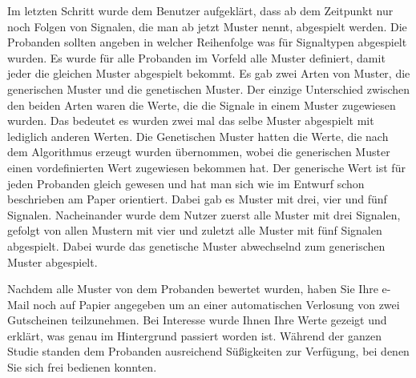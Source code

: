 Im letzten Schritt wurde dem Benutzer aufgekl{\"a}rt, dass ab dem Zeitpunkt nur noch Folgen von Signalen, die man ab jetzt Muster nennt, abgespielt werden.
Die Probanden sollten angeben in welcher Reihenfolge was f{\"u}r Signaltypen abgespielt wurden. 
Es wurde f{\"u}r alle Probanden im Vorfeld alle Muster definiert, damit jeder die gleichen Muster abgespielt bekommt. 
Es gab zwei Arten von Muster, die generischen Muster und die genetischen Muster. 
Der einzige Unterschied zwischen den beiden Arten waren die Werte, die die Signale in einem Muster zugewiesen wurden. 
Das bedeutet es wurden zwei mal das selbe Muster abgespielt mit lediglich anderen Werten. 
Die Genetischen Muster hatten die Werte, die nach dem Algorithmus erzeugt wurden {\"u}bernommen, wobei die generischen Muster einen vordefinierten Wert zugewiesen bekommen hat. 
Der generische Wert ist f{\"u}r jeden Probanden gleich gewesen und hat man sich wie im Entwurf schon beschrieben am Paper \cite{pescara2016ruttelflug} orientiert.
Dabei gab es Muster mit drei, vier und f{\"u}nf Signalen. 
Nacheinander wurde dem Nutzer zuerst alle Muster mit drei Signalen, gefolgt von allen Mustern mit vier und zuletzt alle Muster mit fünf Signalen abgespielt. 
Dabei wurde das genetische Muster abwechselnd zum generischen Muster abgespielt. 

Nachdem alle Muster von dem Probanden bewertet wurden, haben Sie Ihre e-Mail noch auf Papier angegeben um an einer automatischen Verlosung von zwei Gutscheinen teilzunehmen. 
Bei Interesse wurde Ihnen Ihre Werte gezeigt und erkl{\"a}rt, was genau im Hintergrund passiert worden ist. 
W{\"a}hrend der ganzen Studie standen dem Probanden ausreichend S{\"u}{\ss}igkeiten zur Verf{\"u}gung, bei denen Sie sich frei bedienen konnten.

